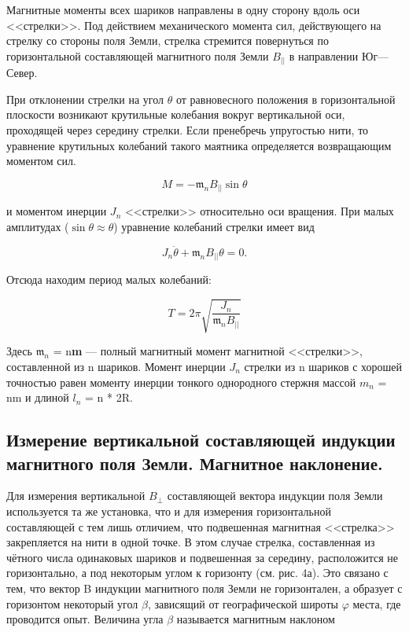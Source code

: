 \documentclass[a4paper,12pt]{article}
\begin{document}
Магнитные моменты всех шариков направлены в одну сторону вдоль оси <<стрелки>>. Под действием механического момента
сил, действующего на стрелку со стороны
поля Земли, стрелка стремится повернуться
по горизонтальной составляющей магнитного поля Земли $B_{||}$ в направлении Юг—Север.

При отклонении стрелки на угол $\theta$ от равновесного положения в горизонтальной плоскости возникают крутильные колебания вокруг вертикальной оси, проходящей через середину стрелки. Если пренебречь упругостью нити, то уравнение крутильных колебаний такого
маятника определяется возвращающим моментом сил.

\begin{equation}
	M = - \mathfrak{m}_n B_{||} \sin \theta
\end{equation}

и моментом инерции $J_n$ <<стрелки>> относительно оси вращения. При малых амплитудах ($\sin \theta \approx \theta$) уравнение колебаний стрелки имеет вид

\begin{equation}
	J_n \ddot{\theta} + \mathfrak{m}_n B_{||} \theta = 0.
\end{equation}

Отсюда находим период малых колебаний:

\begin{equation}
	   T = 2\pi \sqrt{ \frac{J_n}{\mathfrak{m}_n B_{||}} }
\end{equation}

Здесь $\mathfrak{m}_n$ = n\textbf{m} — полный магнитный момент магнитной <<стрелки>>,
составленной из n шариков. Момент инерции $J_n$ стрелки из n шариков с
хорошей точностью равен моменту инерции тонкого однородного стержня массой $m_n$ = nm и длиной $l_n$ = n * 2R.

\newpage

\subsection*{Измерение вертикальной составляющей индукции магнитного поля Земли. Магнитное наклонение.}

Для измерения вертикальной $B_{\perp}$ составляющей вектора индукции
поля Земли используется та же установка, что и для измерения горизонтальной составляющей с тем лишь отличием, что подвешенная магнитная <<стрелка>> закрепляется на нити в одной точке. В этом случае
стрелка, составленная из чётного числа одинаковых шариков и подвешенная за середину, расположится не горизонтально, а под некоторым
углом к горизонту (см. рис. 4а). Это связано с тем, что вектор B индукции магнитного поля Земли не горизонтален, а образует с горизонтом
некоторый угол $\beta$, зависящий от географической широты $\varphi$ места, где
проводится опыт. Величина угла $\beta$ называется магнитным наклоном
\end{document}
